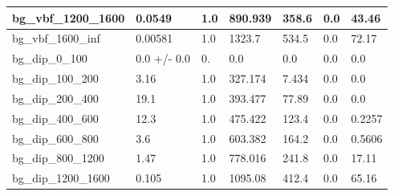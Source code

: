 \documentclass[a4paper, 10pt]{article}
\begin{document}
\begin{table}[H]
\begin{center}
\begin{tabular}{|m{23.0mm}|m{23.0mm}|m{18.0mm}|m{19.0mm}|m{19.0mm}|m{19.0mm}|m{19.0mm}|}
      \hline
      {\cellcolor{white}         bg\_vbf\_1200\_1600}& {\cellcolor{white}         0.0549}& {\cellcolor{white}         1.0}& {\cellcolor{white}         890.939}& {\cellcolor{white}         358.6}& {\cellcolor{red}         0.0}& {\cellcolor{red}         43.46}\\
      \hline
      {\cellcolor{white}         bg\_vbf\_1600\_inf}& {\cellcolor{white}         0.00581}& {\cellcolor{white}         1.0}& {\cellcolor{white}         1323.7}& {\cellcolor{white}         534.5}& {\cellcolor{red}         0.0}& {\cellcolor{red}         72.17}\\
      \hline
      {\cellcolor{white}         bg\_dip\_0\_100}& {\cellcolor{white}         0.0 +/\-- 0.0}& {\cellcolor{white}         0.}& {\cellcolor{white}         0.0}& {\cellcolor{white}         0.0}& {\cellcolor{green}         0.0}& {\cellcolor{green}         0.0}\\
      \hline
      {\cellcolor{white}         bg\_dip\_100\_200}& {\cellcolor{white}         3.16}& {\cellcolor{white}         1.0}& {\cellcolor{white}         327.174}& {\cellcolor{white}         7.434}& {\cellcolor{green}         0.0}& {\cellcolor{green}         0.0}\\
      \hline
      {\cellcolor{white}         bg\_dip\_200\_400}& {\cellcolor{white}         19.1}& {\cellcolor{white}         1.0}& {\cellcolor{white}         393.477}& {\cellcolor{white}         77.89}& {\cellcolor{green}         0.0}& {\cellcolor{green}         0.0}\\
      \hline
      {\cellcolor{white}         bg\_dip\_400\_600}& {\cellcolor{white}         12.3}& {\cellcolor{white}         1.0}& {\cellcolor{white}         475.422}& {\cellcolor{white}         123.4}& {\cellcolor{green}         0.0}& {\cellcolor{green}         0.2257}\\
      \hline
      {\cellcolor{white}         bg\_dip\_600\_800}& {\cellcolor{white}         3.6}& {\cellcolor{white}         1.0}& {\cellcolor{white}         603.382}& {\cellcolor{white}         164.2}& {\cellcolor{green}         0.0}& {\cellcolor{green}         0.5606}\\
      \hline
      {\cellcolor{white}         bg\_dip\_800\_1200}& {\cellcolor{white}         1.47}& {\cellcolor{white}         1.0}& {\cellcolor{white}         778.016}& {\cellcolor{white}         241.8}& {\cellcolor{red}         0.0}& {\cellcolor{red}         17.11}\\
      \hline
      {\cellcolor{white}         bg\_dip\_1200\_1600}& {\cellcolor{white}         0.105}& {\cellcolor{white}         1.0}& {\cellcolor{white}         1095.08}& {\cellcolor{white}         412.4}& {\cellcolor{red}         0.0}& {\cellcolor{red}         65.16}\\

\end{tabular}
\end{center}
\end{table}
\end{document}
